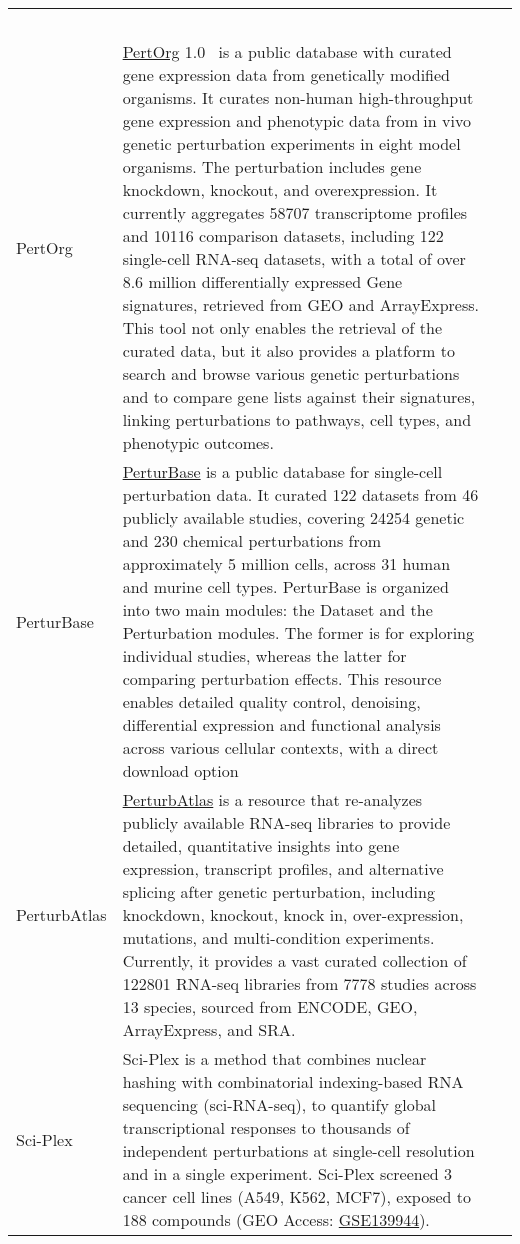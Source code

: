 \begin{newpdflayout}{210mm}{297mm}
\begin{center}
\begin{longtable}{@{} p{} >{\raggedright\arraybackslash}p{} p{} @{}}
  ~\cite{RN120} \\
PertOrg &
  \href{http://www.inbirg.com/pertorg/home}{PertOrg} 1.0~\cite{RN87} is a public database with curated gene expression data from genetically modified organisms. It curates non-human high-throughput gene expression and phenotypic data from in vivo genetic perturbation experiments in eight model organisms. The perturbation includes gene knockdown, knockout, and overexpression. It currently aggregates 58707 transcriptome profiles and 10116 comparison datasets, including 122 single-cell RNA-seq datasets, with a total of over 8.6 million differentially expressed \gls{Gene signature}s, retrieved from GEO and ArrayExpress. This tool not only enables the retrieval of the curated data, but it also provides a platform to search and browse various genetic perturbations and to compare gene lists against their signatures, linking perturbations to pathways, cell types, and phenotypic outcomes. &
  ~\cite{RN85} \\
PerturBase &
  \href{http://www.perturbase.cn/}{PerturBase} is a public database for single-cell perturbation data. It curated 122 datasets from 46 publicly available studies, covering 24254 genetic and 230 chemical perturbations from approximately 5 million cells, across 31 human and murine cell types. PerturBase is organized into two main modules: the Dataset and the Perturbation modules. The former is for exploring individual studies, whereas the latter for comparing perturbation effects. This resource enables detailed quality control, denoising, differential expression and functional analysis across various cellular contexts, with a direct download option &
  ~\cite{RN97} \\
PerturbAtlas &
  \href{https://perturbatlas.kratoss.site/#/}{PerturbAtlas} is a resource that re-analyzes publicly available RNA-seq libraries to provide detailed, quantitative insights into gene expression, transcript profiles, and alternative splicing after genetic perturbation, including knockdown, knockout, knock in, over-expression, mutations, and multi-condition experiments. Currently, it provides a vast curated collection of 122801 RNA-seq libraries from 7778 studies across 13 species, sourced from ENCODE, GEO, ArrayExpress, and SRA. &
  ~\cite{RN129} \\
Sci-Plex &
  Sci-Plex is a method that combines nuclear hashing with combinatorial indexing-based RNA sequencing (sci-RNA-seq), to quantify global transcriptional responses to thousands of independent perturbations at single-cell resolution and in a single experiment. Sci-Plex screened 3 cancer cell lines (A549, K562, MCF7), exposed to 188 compounds (GEO Access: \href{https://www.ncbi.nlm.nih.gov/geo/query/acc.cgi?acc=GSE139944}{GSE139944}). &

\end{longtable}
\end{center}
\end{newpdflayout}
